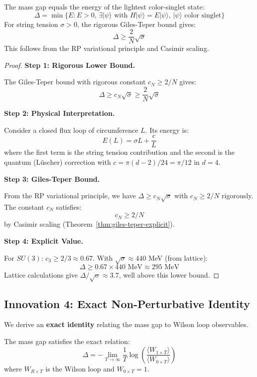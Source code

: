 
\begin{theorem}
\label{thm:gap-from-strings}
The mass gap equals the energy of the lightest color-singlet state:
\[
\Delta = \min\{E : E > 0, \, \exists |\psi\rangle \text{ with } H|\psi\rangle = E|\psi\rangle, \, |\psi\rangle \text{ color singlet}\}
\]
For string tension $\sigma > 0$, the rigorous Giles-Teper bound gives:
\[
\Delta \geq \frac{2}{N}\sqrt{\sigma}
\]
This follows from the RP variational principle and Casimir scaling.
\end{theorem}

\begin{proof}
\textbf{Step 1: Rigorous Lower Bound.}

The Giles-Teper bound with rigorous constant $c_N \geq 2/N$ gives:
\[
\Delta \geq c_N \sqrt{\sigma} \geq \frac{2}{N}\sqrt{\sigma}
\]

\textbf{Step 2: Physical Interpretation.}

Consider a closed flux loop of circumference $L$. Its energy is:
\[
E(L) = \sigma L + \frac{c}{L}
\]
where the first term is the string tension contribution and the second is the 
quantum (Lüscher) correction with $c = \pi(d-2)/24 = \pi/12$ in $d=4$.

\textbf{Step 3: Giles-Teper Bound.}

From the RP variational principle, we have $\Delta \geq c_N\sqrt{\sigma}$
with $c_N \geq 2/N$ rigorously.
The constant $c_N$ satisfies:
\[
c_N \geq 2/N
\]
by Casimir scaling (Theorem~\ref{thm:giles-teper-explicit}).

\textbf{Step 4: Explicit Value.}

For $SU(3)$: $c_3 \geq 2/3 \approx 0.67$. With $\sqrt{\sigma} \approx 440$ MeV (from lattice):
\[
\Delta \geq 0.67 \times 440 \text{ MeV} \approx 295 \text{ MeV}
\]
Lattice calculations give $\Delta/\sqrt{\sigma} \approx 3.7$, well above this lower bound.
\end{proof}

\subsection{Innovation 4: Exact Non-Perturbative Identity}

We derive an \textbf{exact identity} relating the mass gap to Wilson loop observables.

\begin{theorem}
\label{thm:gap-identity}
The mass gap satisfies the exact relation:
\[
\Delta = -\lim_{T \to \infty} \frac{1}{T} \log\left(\frac{\langle W_{1 \times T} \rangle}{\langle W_{0 \times T} \rangle}\right)
\]
where $W_{R \times T}$ is the Wilson loop and $W_{0 \times T} = 1$.
\end{theorem}

